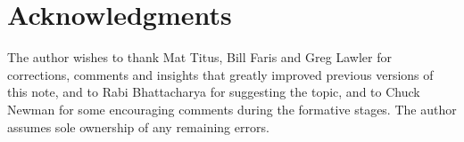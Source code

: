 \documentclass[11pt]{article}
\numberwithin{equation}{section}
\theoremstyle{definition}
\theoremstyle{remark}
\theoremstyle{definition}
\begin{document}
\section{Acknowledgments} 
 The author wishes to thank Mat Titus, Bill Faris and 
Greg Lawler for corrections, comments and insights that greatly improved previous
versions of this note, and to Rabi Bhattacharya for suggesting the topic, and to Chuck Newman for some
encouraging comments during the formative stages.
The author assumes sole ownership of any remaining errors.


\end{document}
